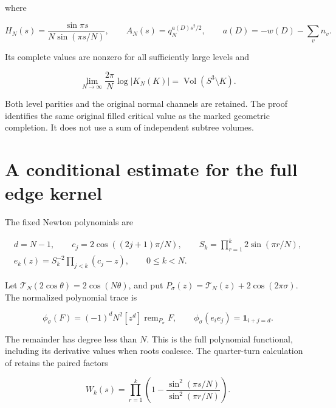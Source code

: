 where

\begin{equation}\label{dk:eq-11}
H_N(s)=\frac{\sin\pi s}{N\sin(\pi s/N)},\qquad
 A_N(s)=q_N^{a(D)s^2/2},\qquad a(D)=-w(D)-\sum_vn_v.
\end{equation}

Its complete values are nonzero for all sufficiently large levels and

\begin{equation}\label{dk:eq-12}
\lim_{N\to\infty}\frac{2\pi}{N}\log|K_N(K)|
                      =\operatorname{Vol}(S^3\setminus K).
\end{equation}

Both level parities and the original normal channels are retained.
The proof identifies the same original filled critical value as the
marked geometric completion. It does not use a sum of independent
subtree volumes.

\section{A conditional estimate for the full edge kernel}\label{dk:sec-2}

The fixed Newton polynomials are

\begin{equation}\label{dk:eq-N1}
\begin{gathered}
 d=N-1,\qquad c_j=2\cos((2j+1)\pi/N),\qquad
 S_k=\prod_{r=1}^k2\sin(\pi r/N),\\
 e_k(z)=S_k^{-2}\prod_{j<k}(c_j-z),\qquad 0\le k<N.
 \end{gathered}
\end{equation}

Let \(\mathcal T_N(2\cos\theta)=2\cos(N\theta)\), and put
\(P_\sigma(z)=\mathcal T_N(z)+2\cos(2\pi\sigma)\). The normalized
polynomial trace is

\begin{equation}\label{dk:eq-N2}
\phi_\sigma(F)=(-1)^dN^2[z^d]\operatorname{rem}_{P_\sigma}F,
 \qquad \phi_\sigma(e_i e_j)=\mathbf1_{i+j=d}.
\end{equation}

The remainder has degree less than \(N\). This is the full polynomial
functional, including its derivative values when roots coalesce.
The quarter-turn calculation of \cite[Section~5]{MeridianTangles}
retains the paired factors

\begin{equation}\label{dk:eq-N3}
W_k(s)=\prod_{r=1}^k
     \left(1-\frac{\sin^2(\pi s/N)}{\sin^2(\pi r/N)}\right).
\end{equation}

